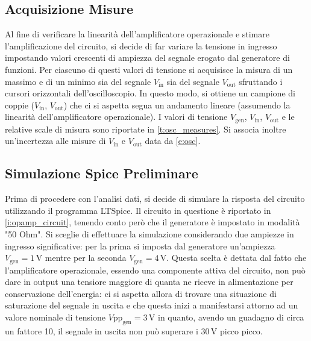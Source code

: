 \documentclass[a4paper,11pt]{article} %
\begin{document}

\subsection{Acquisizione Misure}
Al fine di verificare la linearità dell'amplificatore operazionale e stimare l'amplificazione del circuito, si decide di
far variare la tensione in ingresso impostando valori crescenti di ampiezza del segnale erogato dal generatore di
funzioni. Per ciascuno di questi valori di tensione si acquisisce la misura di un massimo e di un minimo sia del segnale
$V_{\text{in}}$ sia del segnale $V_{\text{out}}$ sfruttando i cursori orizzontali dell'oscilloscopio. In questo modo, si
ottiene un campione di coppie ($V_{\text{in}}$, $V_{\text{out}}$) che ci si aspetta segua un andamento lineare (assumendo
la linearità dell'amplificatore operazionale). I valori di tensione $V_{\text{gen}}$, $V_{\text{in}}$, $V_{\text{out}}$ e
le relative scale di misura sono riportate in  \autoref{t:osc_measures}. Si associa inoltre un'incertezza alle misure
di $V_{\text{in}}$ e $V_{\text{out}}$ data da  \autoref{e:osc}.\\


\subsection{Simulazione Spice Preliminare}\label{s:spice}
Prima di procedere con l'analisi dati, si decide di simulare la risposta del circuito utilizzando il programma LTSpice.
Il circuito in questione è riportato in  \autoref{i:opamp_circuit}, tenendo conto però che il generatore è impostato
in modalità "50 Ohm". Si sceglie di effettuare la simulazione considerando due ampiezze in ingresso significative: per
la prima si imposta dal generatore un'ampiezza $V_{\text{gen}}=1\,\si{\volt}$ mentre per la seconda
$V_{\text{gen}}=4\,\si{\volt}$. Questa scelta è dettata dal fatto che l'amplificatore operazionale, essendo una
componente attiva del circuito, non può dare in output una tensiore maggiore di quanta ne riceve in alimentazione per
conservazione dell'energia: ci si aspetta allora di trovare una situazione di saturazione del segnale in uscita e che
questa inizi a manifestarsi attorno ad un valore nominale di tensione $V\text{pp}_{\text{gen}}=3\,\si{\volt}$ in quanto,
avendo un guadagno di circa un fattore 10, il segnale in uscita non può superare i $30\,\si{\volt}$
picco picco.
\end{document}
